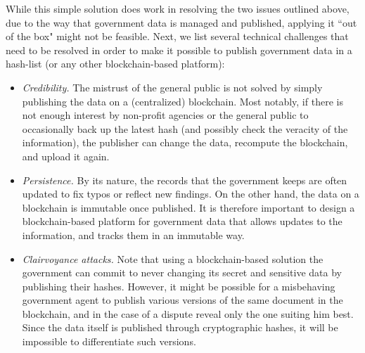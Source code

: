 While this simple solution does work in resolving the two issues outlined above, due to the way that government data is managed and published, applying it ``out of the box" might not be feasible. Next, we list several technical challenges that need to be resolved in order to make it possible to publish government data in a hash-list (or any other blockchain-based platform):
\begin{itemize}
\item {\it Credibility.} The mistrust of the general public is not solved by simply publishing the data on a (centralized) blockchain. Most notably, if there is not enough interest by non-profit agencies or the general public to occasionally back up the latest hash (and possibly check the veracity of the information), the publisher can change the data, recompute the blockchain, and upload it again. %
\item {\it Persistence.} By its nature, the records that the government keeps are often updated to fix typos or reflect new findings. On the other hand, the data on a blockchain is immutable once published. It is therefore important to design a blockchain-based platform for government data that allows updates to the information, and tracks them in an  immutable way.
\item {\it Clairvoyance attacks.} Note that using a blockchain-based solution the government can commit to never changing its secret and sensitive data by publishing their hashes. However, it might be possible for a misbehaving government agent to publish various versions of the same document in the blockchain, and in the case of a dispute reveal only the one suiting him best. Since the data itself is published through cryptographic hashes, it will be impossible to differentiate such versions.
\end{itemize}

